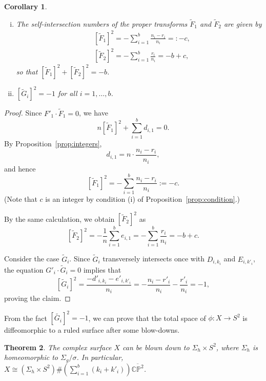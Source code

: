 \documentclass[10pt,a4paper,reqno]{amsart}
\newtheorem{thm}{Theorem}[section]
\newtheorem{cor}[thm]{Corollary}
\theoremstyle{definition}
\numberwithin{equation}{section}
\numberwithin{figure}{section}
\newcommand{\CP}{\mathbb{CP}}
\newcommand{\arrowr}{\rightarrow}
\begin{document}
\begin{cor}
\begin{enumerate}[(i)]
\item The self-intersection numbers of the proper transforms $\tilde{F}_1$ and $\tilde{F}_2$ are given by
\begin{align*}
&[\tilde{F}_1]^2=-\sum_{i=1}^b\frac{n_i-r_i}{n_i}=:-c,\\ 
&[\tilde{F}_2]^2=-\sum_{i=1}^b \frac{r_i}{n_i}=-b+c, \end{align*} 
so that $[\tilde{F}_1]^2+[\tilde{F}_2]^2=-b$.

\item $[\tilde{G}_i]^2=-1$ for all $i=1,\dots, b$.
\end{enumerate}
\end{cor}

\begin{proof}
Since $F'_1 \cdot \tilde{F}_1=0$, we have \[n [\tilde{F}_1]^2 +\sum_{i=1}^b d_{i,1}=0.\]
By Proposition~\ref{prop:integers}, \[d_{i,1}=n\cdot \frac{n_i-r_i}{n_i},\] and hence
\[[\tilde{F}_1]^2 =-\sum_{i=1}^b \frac{n_i-r_i}{n_i}:=-c.\]
(Note that $c$ is an integer by condition (i) of Proposition~\ref{prop:condition}.)

By the same calculation, we obtain $[\tilde{F}_2]^2$ as
\[[\tilde{F}_2]^2=-\frac{1}{n}\sum_{i=1}^b e_{i,1}=-\sum_{i=1}^b\frac{r_i}{n_i}=-b+c.\]

Consider the case $\tilde{G}_i$. Since $\tilde{G}_i$ transversely intersects once with $D_{i,k_i}$ and $E_{i,k'_i}$, 
the equation $G'_i \cdot \tilde{G}_i=0$ implies that
\[[\tilde{G}_i]^2=\frac{-d'_{i,k_i}-e'_{i,k'_i}}{n_i}=-\frac{n_i-r'_i}{n_i}-\frac{r'_i}{n_i}=-1,\]
proving the claim.
\end{proof}

From the fact $[\tilde{G_i}]^2=-1$, we can prove that the total space of $\phi:X \arrowr S^2$ is diffeomorphic to a ruled surface after some blow-downs.
\begin{thm}\label{thm:total}
The complex surface $X$ can be blown down to $\Sigma_h \times S^2$, where $\Sigma_h$ is homeomorphic to $\Sigma_g / \sigma$.
In particular, $X \cong (\Sigma_h \times S^2) \# (\sum_{i=1}^b (k_i+k'_i)) \overline{\CP^2}$.
\end{thm}
\end{document}

